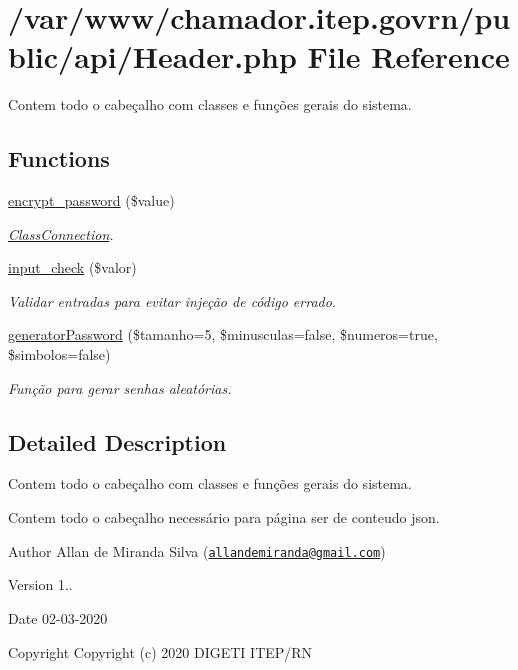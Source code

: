 \hypertarget{_header_8php}{}\section{/var/www/chamador.itep.\+govrn/public/api/\+Header.php File Reference}
\label{_header_8php}


Contem todo o cabeçalho com classes e funções gerais do sistema.  


\subsection*{Functions}
\begin{DoxyCompactItemize}
\item 
\hyperlink{_header_8php_a5455ea8d21f7611dae58e3d4612fb3bd}{encrypt\+\_\+password} (\$value)
\begin{DoxyCompactList}\small\item\em \hyperlink{class_class_connection}{Class\+Connection}. \end{DoxyCompactList}\item 
\hyperlink{_header_8php_a8909d20d656fecf83ebaa2bed0cab2c1}{input\+\_\+check} (\$valor)
\begin{DoxyCompactList}\small\item\em Validar entradas para evitar injeção de código errado. \end{DoxyCompactList}\item 
\hyperlink{_header_8php_a8db8ce321ecc739cc840efd11c612b10}{generator\+Password} (\$tamanho=5, \$minusculas=false, \$numeros=true, \$simbolos=false)
\begin{DoxyCompactList}\small\item\em Função para gerar senhas aleatórias. \end{DoxyCompactList}\end{DoxyCompactItemize}


\subsection{Detailed Description}
Contem todo o cabeçalho com classes e funções gerais do sistema. 

Contem todo o cabeçalho necessário para página ser de conteudo json.

\begin{DoxyAuthor}{Author}
Allan de Miranda Silva (\href{mailto:allandemiranda@gmail.com}{\tt allandemiranda@gmail.\+com}) 
\end{DoxyAuthor}
\begin{DoxyVersion}{Version}
1.. 
\end{DoxyVersion}
\begin{DoxyDate}{Date}
02-\/03-\/2020
\end{DoxyDate}
\begin{DoxyCopyright}{Copyright}
Copyright (c) 2020 D\+I\+G\+E\+TI I\+T\+E\+P/\+RN 
\end{DoxyCopyright}


